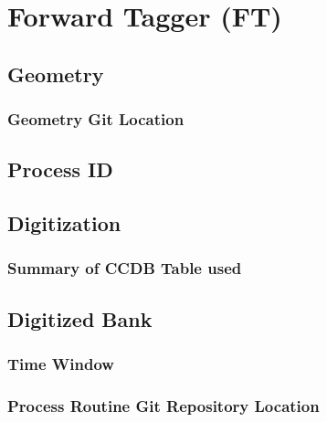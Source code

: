 \section{Forward Tagger (FT)}


\subsection{Geometry}

\subsubsection{Geometry Git Location}

\subsection{Process ID}

\subsection{Digitization}

\subsubsection{Summary of CCDB Table used}

\subsection{Digitized Bank}

\subsubsection{Time Window}

\subsubsection{Process Routine Git Repository Location}


